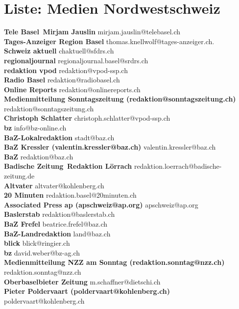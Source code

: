 \documentclass{scrartcl}
\begin{document}
\section*{Liste: Medien Nordwestschweiz}
\textbf{Tele Basel\, Mirjam Jauslin } mirjam.jauslin@telebasel.ch\\
\textbf{Tages-Anzeiger Region Basel } thomas.knellwolf@tages-anzeiger.ch.\\
\textbf{Schweiz aktuell } chaktuell@sfdrs.ch\\
\textbf{regionaljournal } regionaljournal.basel@srdrs.ch\\
\textbf{redaktion vpod } redaktion@vpod-ssp.ch\\
\textbf{Radio Basel } redaktion@radiobasel.ch\\
\textbf{Online Reports } redaktion@onlinereports.ch\\
\textbf{Medienmitteilung Sonntagszeitung (redaktion@sonntagszeitung.ch)\n	 } redaktion@sonntagszeitung.ch\\
\textbf{Christoph Schlatter } christoph.schlatter@vpod-ssp.ch\\
\textbf{bz } info@bz-online.ch\\
\textbf{BaZ-Lokalredaktion } stadt@baz.ch\\
\textbf{BaZ Kressler (valentin.kressler@baz.ch) } valentin.kressler@baz.ch\\
\textbf{BaZ } redaktion@baz.ch\\
\textbf{Badische Zeitung\, Redaktion  Lörrach\n	 } redaktion.loerrach@badische-zeitung.de\\
\textbf{Altvater } altvater@kohlenberg.ch\\
\textbf{20 Minuten } redaktion.basel@20minuten.ch\\
\textbf{Associated Press ap (apschweiz@ap.org) } apschweiz@ap.org\\
\textbf{Baslerstab } redaktion@baslerstab.ch\\
\textbf{BaZ Frefel } beatrice.frefel@baz.ch\\
\textbf{BaZ-Landredaktion } land@baz.ch\\
\textbf{blick } blick@ringier.ch\\
\textbf{bz } david.weber@bz-ag.ch\\
\textbf{Medienmitteilung NZZ am Sonntag (redaktion.sonntag@nzz.ch)\n	 } redaktion.sonntag@nzz.ch\\
\textbf{Oberbaselbieter Zeitung } m.schaffner@dietschi.ch\\
\textbf{Pieter Poldervaart (poldervaart@kohlenberg.ch)\n	 } poldervaart@kohlenberg.ch\\
\end{document}
